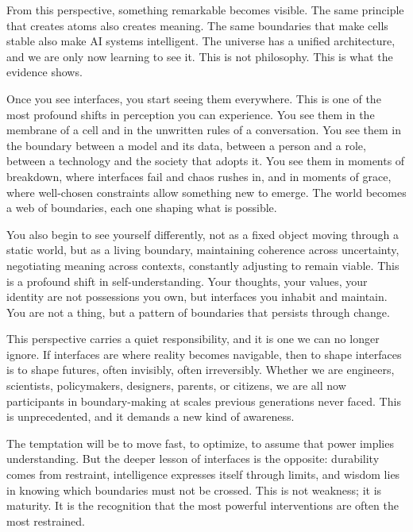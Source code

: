 \documentclass[
  openright]{book}
\begin{document}
From this perspective, something remarkable becomes visible. The same
principle that creates atoms also creates meaning. The same boundaries
that make cells stable also make AI systems intelligent. The universe
has a unified architecture, and we are only now learning to see it. This
is not philosophy. This is what the evidence shows.

Once you see interfaces, you start seeing them
everywhere. This is one of the most profound shifts in perception you
can experience. You see them in the membrane of a cell and in the
unwritten rules of a conversation. You see them in the
boundary between a model and its data, between a person
and a role, between a technology and the society that adopts it. You see
them in moments of breakdown, where interfaces fail and chaos rushes in,
and in moments of grace, where well-chosen constraints
allow something new to emerge. The world becomes a web of boundaries,
each one shaping what is possible.

You also begin to see yourself differently, not as a fixed object moving
through a static world, but as a living boundary,
maintaining coherence across uncertainty, negotiating
meaning across contexts, constantly adjusting to remain
viable. This is a profound shift in self-understanding. Your thoughts,
your values, your identity are not possessions you own,
but interfaces you inhabit and maintain. You are not a
thing, but a pattern of boundaries that persists through change.

This perspective carries a quiet responsibility, and it is one we can no
longer ignore. If interfaces are where reality becomes navigable, then
to shape interfaces is to shape futures, often invisibly, often
irreversibly. Whether we are engineers, scientists, policymakers,
designers, parents, or citizens, we are all now participants in
boundary-making at scales previous generations never faced. This is
unprecedented, and it demands a new kind of awareness.

The temptation will be to move fast, to optimize, to assume that power
implies understanding. But the deeper lesson of interfaces is the
opposite: durability comes from restraint, intelligence expresses itself
through limits, and wisdom lies in knowing which boundaries must not be
crossed. This is not weakness; it is maturity. It is the recognition
that the most powerful interventions are often the most restrained.
\end{document}
